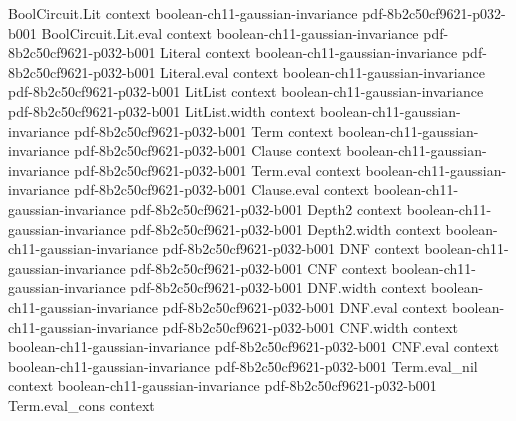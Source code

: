 \begin{theorem}
\label{BooleanAnalysis.GaussianSpace.gaussianNoise_tendsto_one}
\leanok
{}
\proofstep
  {BoolCircuit.Lit}
  {context}
  {boolean-ch11-gaussian-invariance}
  {pdf-8b2c50cf9621-p032-b001}
\proofstep
  {BoolCircuit.Lit.eval}
  {context}
  {boolean-ch11-gaussian-invariance}
  {pdf-8b2c50cf9621-p032-b001}
\proofstep
  {Literal}
  {context}
  {boolean-ch11-gaussian-invariance}
  {pdf-8b2c50cf9621-p032-b001}
\proofstep
  {Literal.eval}
  {context}
  {boolean-ch11-gaussian-invariance}
  {pdf-8b2c50cf9621-p032-b001}
\proofstep
  {LitList}
  {context}
  {boolean-ch11-gaussian-invariance}
  {pdf-8b2c50cf9621-p032-b001}
\proofstep
  {LitList.width}
  {context}
  {boolean-ch11-gaussian-invariance}
  {pdf-8b2c50cf9621-p032-b001}
\proofstep
  {Term}
  {context}
  {boolean-ch11-gaussian-invariance}
  {pdf-8b2c50cf9621-p032-b001}
\proofstep
  {Clause}
  {context}
  {boolean-ch11-gaussian-invariance}
  {pdf-8b2c50cf9621-p032-b001}
\proofstep
  {Term.eval}
  {context}
  {boolean-ch11-gaussian-invariance}
  {pdf-8b2c50cf9621-p032-b001}
\proofstep
  {Clause.eval}
  {context}
  {boolean-ch11-gaussian-invariance}
  {pdf-8b2c50cf9621-p032-b001}
\proofstep
  {Depth2}
  {context}
  {boolean-ch11-gaussian-invariance}
  {pdf-8b2c50cf9621-p032-b001}
\proofstep
  {Depth2.width}
  {context}
  {boolean-ch11-gaussian-invariance}
  {pdf-8b2c50cf9621-p032-b001}
\proofstep
  {DNF}
  {context}
  {boolean-ch11-gaussian-invariance}
  {pdf-8b2c50cf9621-p032-b001}
\proofstep
  {CNF}
  {context}
  {boolean-ch11-gaussian-invariance}
  {pdf-8b2c50cf9621-p032-b001}
\proofstep
  {DNF.width}
  {context}
  {boolean-ch11-gaussian-invariance}
  {pdf-8b2c50cf9621-p032-b001}
\proofstep
  {DNF.eval}
  {context}
  {boolean-ch11-gaussian-invariance}
  {pdf-8b2c50cf9621-p032-b001}
\proofstep
  {CNF.width}
  {context}
  {boolean-ch11-gaussian-invariance}
  {pdf-8b2c50cf9621-p032-b001}
\proofstep
  {CNF.eval}
  {context}
  {boolean-ch11-gaussian-invariance}
  {pdf-8b2c50cf9621-p032-b001}
\proofstep
  {Term.eval_nil}
  {context}
  {boolean-ch11-gaussian-invariance}
  {pdf-8b2c50cf9621-p032-b001}
\proofstep
  {Term.eval_cons}
  {context}

\end{theorem}
